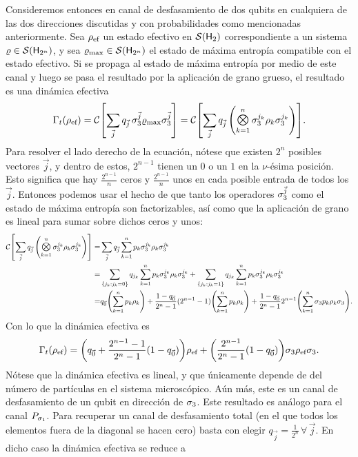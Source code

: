 Consideremos entonces en canal de desfasamiento de dos qubits en cualquiera de las dos direcciones discutidas y con probabilidades como mencionadas anteriormente. Sea $\rho_{\text{ef}}$ un estado efectivo en $\mathcal{S}({\sf H}_{2})$ correspondiente a un sistema $\varrho \in \mathcal{S}({\sf H}_{2^{n}})$, y sea $\varrho_{\max}\in\mathcal{S}({\sf H}_{2^{n}})$ el estado de máxima entropía compatible con el estado efectivo. Si se propaga al estado de máxima entropía por medio de este canal y luego se pasa el resultado por la aplicación de grano grueso, el resultado es una dinámica efectiva
\begin{equation}
  \Gamma_{t}(\rho_{\ef})=\mcC\qty[\sum_{\vec{j}}q_{\vec{j}}\,\pauli{3}^{\vec{j}}\varrho_{\max}\pauli{3}^{\vec{j}}]=\mcC\qty[\sum_{\vec{j}}q_{\vec{j}}\,\qty(\Motimes_{k=1}^{n} \pauli{3}^{j_{k}}\rho_{k}\pauli{3}^{j_{k}})]\nonumber.\nonumber
\end{equation}
Para resolver el lado derecho de la ecuación, nótese que existen $2^{n}$ posibles vectores $\vec{j}$, y dentro de estos, $2^{n-1}$ tienen un $0$ o un $1$ en la $\nu$-ésima posición. Esto significa que hay $\frac{2^{n-1}}{n}$ ceros y $\frac{2^{n-1}}{n}$ unos en cada posible entrada de todos los $\vec{j}$. Entonces podemos usar el hecho de que tanto los operadores $\sigma_{3}^{\vec{j}}$ como el estado de máxima entropía son factorizables, así como que la aplicación de grano es lineal para sumar sobre dichos ceros y unos:
\begin{align}
    \mcC\qty[\sum_{\vec{j}}q_{\vec{j}}\,\qty(\Motimes_{k=1}^{n} \pauli{3}^{j_{k}}\rho_{k}\pauli{3}^{j_{k}})]=&\sum_{\vec{j}}q_{\vec{j}}\sum_{k=1}^{n}p_{k}\pauli{3}^{j_{k}}\rho_{k}\pauli{3}^{j_{k}}\nonumber\\
    =&\sum_{\{j_{k}:j_{k}=0\}}q_{j_{k}}\sum_{k=1}^{n}p_{k}\pauli{3}^{j_{k}}\rho_{k}\pauli{3}^{j_{k}}+\sum_{\{j_{k}:j_{k}=1\}}q_{j_{k}}\sum_{k=1}^{n}p_{k}\pauli{3}^{j_{k}}\rho_{k}\pauli{3}^{j_{k}}\nonumber\\
    =&q_{\vec{0}}\qty(\sum_{k=1}^{n}p_{k}\rho_{k})+\frac{1-q_{\vec{0}}}{2^{n}-1}(2^{n-1}-1)\qty(\sum_{k=1}^{n}p_{k}\rho_{k})+\frac{1-q_{\vec{0}}}{2^{n}-1}2^{n-1}\qty(\sum_{k=1}^{n}\pauli{3}p_{k}\rho_{k}\pauli{3}).\nonumber
\end{align}
Con lo que la dinámica efectiva es
\begin{equation}
    \Gamma_{t}(\rho_{\text{ef}})=\qty(q_{\vec{0}}+\frac{2^{n-1}-1}{2^{n}-1}(1-q_{\vec{0}}))\rho_{\text{ef}}+\qty(\frac{2^{n-1}}{2^{n}-1}(1-q_{\vec{0}}))\sigma_{3}\rho_{\text{ef}}\sigma_{3}.\nonumber
\end{equation}
Nótese que la dinámica efectiva es lineal, y que únicamente depende de del número de partículas en el sistema microscópico. Aún más, este es un canal de desfasamiento de un qubit en dirección de $\sigma_{3}$. Este resultado es análogo para el canal $P_{\sigma_{1}}$. Para recuperar un canal de desfasamiento total (en el que todos los elementos fuera de la diagonal se hacen cero) basta con elegir $q_{\vec{j}}=\frac{1}{2^{n}}\,\forall\,\vec{j}$. En dicho caso la dinámica efectiva se reduce a
